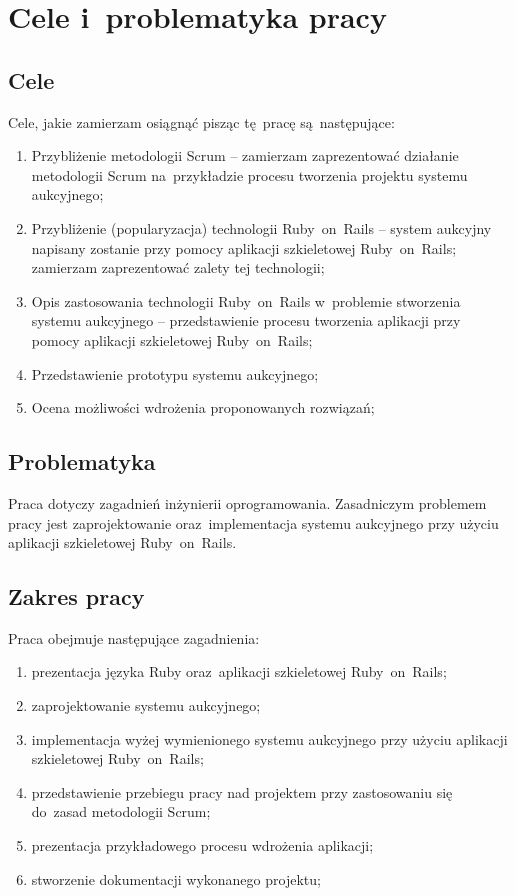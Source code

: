 \section{Cele i~problematyka pracy} \label{cele_problematyka.cele}

\subsection{Cele}

Cele, jakie zamierzam osiągnąć pisząc tę~pracę są~następujące:

\begin{enumerate}
  \item Przybliżenie metodologii Scrum -- zamierzam zaprezentować działanie metodologii Scrum na~przykładzie procesu tworzenia projektu systemu aukcyjnego;
  \item Przybliżenie (popularyzacja) technologii Ruby~on~Rails -- system aukcyjny napisany zostanie przy pomocy aplikacji szkieletowej Ruby~on~Rails; zamierzam zaprezentować zalety tej technologii;
  \item Opis zastosowania technologii Ruby~on~Rails w~problemie stworzenia systemu aukcyjnego -- przedstawienie procesu tworzenia aplikacji przy pomocy aplikacji szkieletowej Ruby~on~Rails;
  \item Przedstawienie prototypu systemu aukcyjnego;
  \item Ocena możliwości wdrożenia proponowanych rozwiązań;
\end{enumerate}

\subsection{Problematyka} \label{cele_problematyka.problematyka}

Praca dotyczy zagadnień inżynierii oprogramowania. Zasadniczym problemem pracy jest zaprojektowanie oraz~implementacja systemu aukcyjnego przy użyciu aplikacji szkieletowej Ruby~on~Rails.

\subsection{Zakres pracy} \label{cele_problematyka.zakres}

Praca obejmuje następujące zagadnienia:

\begin{enumerate}
  \item prezentacja języka Ruby oraz~aplikacji szkieletowej Ruby~on~Rails;
  \item zaprojektowanie systemu aukcyjnego;
  \item implementacja wyżej wymienionego systemu aukcyjnego przy użyciu aplikacji szkieletowej Ruby~on~Rails;
  \item przedstawienie przebiegu pracy nad projektem przy zastosowaniu się do~zasad metodologii Scrum;
  \item prezentacja przykładowego procesu wdrożenia aplikacji;
  \item stworzenie dokumentacji wykonanego projektu;
\end{enumerate}

